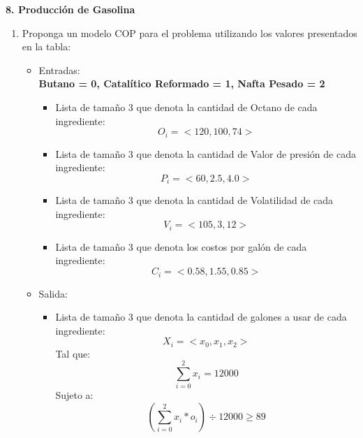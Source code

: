 \documentclass[12pt]{article}
\begin{document}
\newpage

\begin{flushleft}
\textbf{8. Producción de Gasolina}
\end{flushleft}


\begin{enumerate}[label=\alph*]
\item Proponga un modelo COP para el problema utilizando los valores presentados en la tabla:
\begin{justify}
\begin{itemize}
\item Entradas:
\\
\textbf{Butano = 0, Catalítico Reformado = 1, Nafta Pesado = 2}
\begin{itemize}
\item Lista de tamaño 3 que denota la cantidad de Octano de cada ingrediente:
\begin{equation*}
O_{i} = <120,100,74>
\end{equation*}
\item Lista de tamaño 3 que denota la cantidad de Valor de presión de cada ingrediente:
\begin{equation*}
P_{i} = <60,2.5,4.0>
\end{equation*}
\item Lista de tamaño 3 que denota la cantidad de Volatilidad de cada ingrediente:
\begin{equation*}
V_{i} = <105,3,12>
\end{equation*}
\item Lista de tamaño 3 que denota los costos por galón de cada ingrediente:
\begin{equation*}
C_{i} = <0.58,1.55,0.85>
\end{equation*}
\end{itemize}
\item Salida:
\begin{itemize}
\item Lista de tamaño 3 que denota la cantidad de galones a usar de cada ingrediente:
\begin{equation*}
X_{i} = <x_{0}, x_{1}, x_{2}>
\end{equation*}
Tal que:
\begin{equation*}
\sum_{i = 0}^{2} x_{i} = 12000
\end{equation*}
\newpage
Sujeto a:
\begin{equation*}
(\sum_{i = 0}^{2} x_{i} * o_{i}) \div 12000 \geq 89
\end{equation*}
\begin{equation*}

\end{equation*}
\end{itemize}
\end{itemize}
\end{justify}
\end{enumerate}
\end{document}
